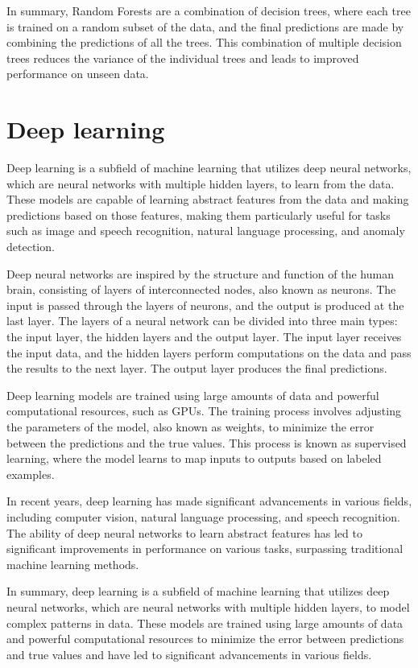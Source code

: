 In summary, Random Forests are a combination of decision trees, where each tree is trained on a random subset of the data, and the final predictions are made by combining the predictions of all the trees. This combination of multiple decision trees reduces the variance of the individual trees and leads to improved performance on unseen data.



\section{Deep learning}
Deep learning \cite{goodfellow2016deep} is a subfield of machine learning that utilizes deep neural networks, which are neural networks with multiple hidden layers, to learn from the data.
These models are capable of learning abstract features from the data and making predictions based on those features, making them particularly useful for tasks such as image and speech recognition, natural language processing, and anomaly detection.

Deep neural networks are inspired by the structure and function of the human brain, consisting of layers of interconnected nodes, also known as neurons.
The input is passed through the layers of neurons, and the output is produced at the last layer.
The layers of a neural network can be divided into three main types: the input layer, the hidden layers and the output layer.
The input layer receives the input data, and the hidden layers perform computations on the data and pass the results to the next layer. 
The output layer produces the final predictions.

Deep learning models are trained using large amounts of data and powerful computational resources, such as GPUs.
The training process involves adjusting the parameters of the model, also known as weights, to minimize the error between the predictions and the true values.
This process is known as supervised learning, where the model learns to map inputs to outputs based on labeled examples.

In recent years, deep learning has made significant advancements in various fields, including computer vision, natural language processing, and speech recognition.
The ability of deep neural networks to learn abstract features has led to significant improvements in performance on various tasks, surpassing traditional machine learning methods.

In summary, deep learning is a subfield of machine learning that utilizes deep neural networks, which are neural networks with multiple hidden layers, to model complex patterns in data.
These models are trained using large amounts of data and powerful computational resources to minimize the error between predictions and true values and have led to significant advancements in various fields.


